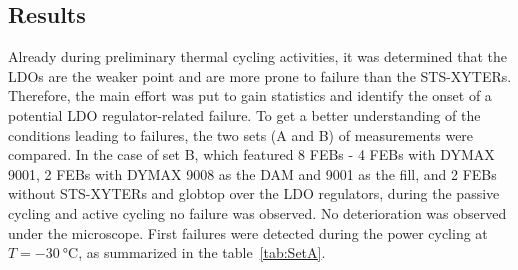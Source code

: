 \subsection{Results}
Already during preliminary thermal cycling activities, it was determined that the \gls{LDO}s are the weaker point and are more prone to failure than the STS-XYTERs. Therefore, the main effort was put to gain statistics and identify the onset of a potential \gls{LDO} regulator-related failure. To get a better understanding of the conditions leading to failures, the two sets (A and B) of measurements were compared. 
In the case of set B, which featured 8 \glspl{FEB} - 4 \glspl{FEB} with DYMAX 9001, 2 \glspl{FEB} with DYMAX 9008 as the DAM and 9001 as the fill, and 2 \glspl{FEB} without STS-XYTERs and globtop over the \gls{LDO} regulators, during the passive cycling and active cycling no failure was observed. No deterioration was observed under the microscope. First failures were detected during the power cycling at $T=\SI{-30}{\celsius}$, as summarized in the table~\ref{tab:SetA}. 
\begin{table}[!h]
\centering
{}
\caption{Detailed description of the \gls{LDO} failure with regard to the type and number
of cycles}
\label{tab:SetA}
\end{table}

